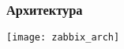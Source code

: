 \begin{frame}[fragile]
    \frametitle{Архитектура}
    \center\texttt{[image: zabbix\_arch]}
\end{frame}